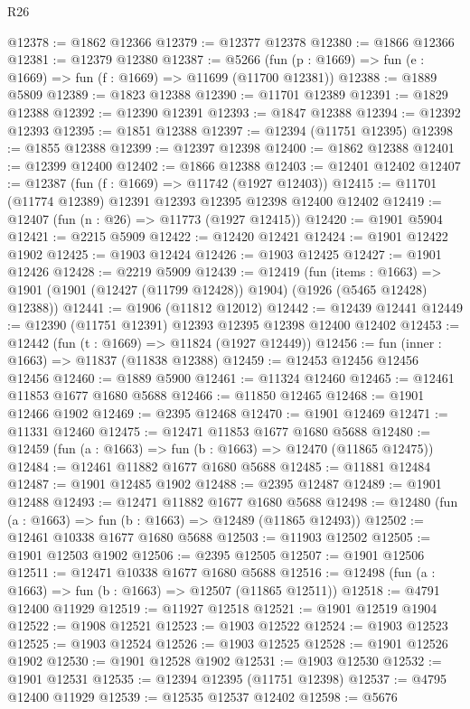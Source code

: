 \begin{lexlean}{R26}
\begin{coremodule}
@12378 := @1862 @12366
@12379 := @12377 @12378
@12380 := @1866 @12366
@12381 := @12379 @12380
@12387 := @5266 (fun (p : @1669) => fun (e : @1669) => fun (f : @1669) => @11699 (@11700 @12381))
@12388 := @1889 @5809
@12389 := @1823 @12388
@12390 := @11701 @12389
@12391 := @1829 @12388
@12392 := @12390 @12391
@12393 := @1847 @12388
@12394 := @12392 @12393
@12395 := @1851 @12388
@12397 := @12394 (@11751 @12395)
@12398 := @1855 @12388
@12399 := @12397 @12398
@12400 := @1862 @12388
@12401 := @12399 @12400
@12402 := @1866 @12388
@12403 := @12401 @12402
@12407 := @12387 (fun (f : @1669) => @11742 (@1927 @12403))
@12415 := @11701 (@11774 @12389) @12391 @12393 @12395 @12398 @12400 @12402
@12419 := @12407 (fun (n : @26) => @11773 (@1927 @12415))
@12420 := @1901 @5904
@12421 := @2215 @5909
@12422 := @12420 @12421
@12424 := @1901 @12422 @1902
@12425 := @1903 @12424
@12426 := @1903 @12425
@12427 := @1901 @12426
@12428 := @2219 @5909
@12439 := @12419
    (fun (items : @1663) =>
    @1901 (@1901 (@12427 (@11799 @12428)) @1904) (@1926 (@5465 @12428) @12388))
@12441 := @1906 (@11812 @12012)
@12442 := @12439 @12441
@12449 := @12390 (@11751 @12391) @12393 @12395 @12398 @12400 @12402
@12453 := @12442 (fun (t : @1669) => @11824 (@1927 @12449))
@12456 := fun (inner : @1663) => @11837 (@11838 @12388)
@12459 := @12453 @12456 @12456 @12456
@12460 := @1889 @5900
@12461 := @11324 @12460
@12465 := @12461 @11853 @1677 @1680 @5688
@12466 := @11850 @12465
@12468 := @1901 @12466 @1902
@12469 := @2395 @12468
@12470 := @1901 @12469
@12471 := @11331 @12460
@12475 := @12471 @11853 @1677 @1680 @5688
@12480 := @12459 (fun (a : @1663) => fun (b : @1663) => @12470 (@11865 @12475))
@12484 := @12461 @11882 @1677 @1680 @5688
@12485 := @11881 @12484
@12487 := @1901 @12485 @1902
@12488 := @2395 @12487
@12489 := @1901 @12488
@12493 := @12471 @11882 @1677 @1680 @5688
@12498 := @12480 (fun (a : @1663) => fun (b : @1663) => @12489 (@11865 @12493))
@12502 := @12461 @10338 @1677 @1680 @5688
@12503 := @11903 @12502
@12505 := @1901 @12503 @1902
@12506 := @2395 @12505
@12507 := @1901 @12506
@12511 := @12471 @10338 @1677 @1680 @5688
@12516 := @12498 (fun (a : @1663) => fun (b : @1663) => @12507 (@11865 @12511))
@12518 := @4791 @12400 @11929
@12519 := @11927 @12518
@12521 := @1901 @12519 @1904
@12522 := @1908 @12521
@12523 := @1903 @12522
@12524 := @1903 @12523
@12525 := @1903 @12524
@12526 := @1903 @12525
@12528 := @1901 @12526 @1902
@12530 := @1901 @12528 @1902
@12531 := @1903 @12530
@12532 := @1901 @12531
@12535 := @12394 @12395 (@11751 @12398)
@12537 := @4795 @12400 @11929
@12539 := @12535 @12537 @12402
@12598 := @5676

\end{coremodule}
\end{lexlean}
